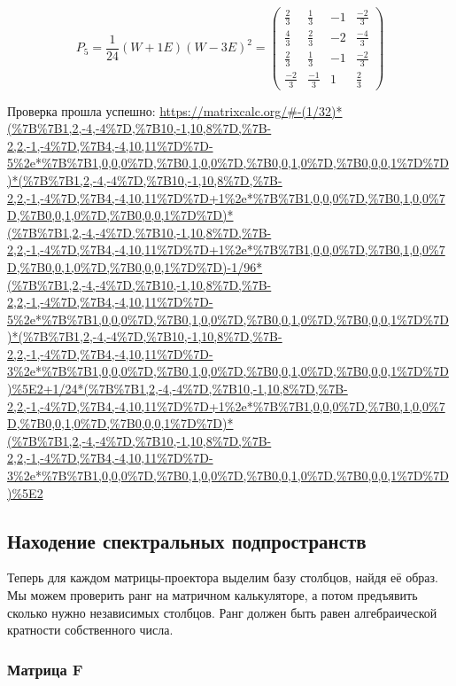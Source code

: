 \documentclass[12pt, a4paper]{article}
\begin{document}
    \begin{equation}
        P_{5} = \frac{1}{24} (W + 1E) (W - 3E)^2 = \left(\begin{matrix}
            \frac{2}{3} & \frac{1}{3} & -1 & \frac{-2}{3} \\
            \frac{4}{3} & \frac{2}{3} & -2 & \frac{-4}{3} \\
            \frac{2}{3} & \frac{1}{3} & -1 & \frac{-2}{3} \\
            \frac{-2}{3} & \frac{-1}{3} & 1 & \frac{2}{3}
        \end{matrix}\right)
    \end{equation}

    Проверка прошла успешно: \url{https://matrixcalc.org/#-(1/32)*(%7B%7B1,2,-4,-4%7D,%7B10,-1,10,8%7D,%7B-2,2,-1,-4%7D,%7B4,-4,10,11%7D%7D-5%2e*%7B%7B1,0,0,0%7D,%7B0,1,0,0%7D,%7B0,0,1,0%7D,%7B0,0,0,1%7D%7D)*(%7B%7B1,2,-4,-4%7D,%7B10,-1,10,8%7D,%7B-2,2,-1,-4%7D,%7B4,-4,10,11%7D%7D+1%2e*%7B%7B1,0,0,0%7D,%7B0,1,0,0%7D,%7B0,0,1,0%7D,%7B0,0,0,1%7D%7D)*(%7B%7B1,2,-4,-4%7D,%7B10,-1,10,8%7D,%7B-2,2,-1,-4%7D,%7B4,-4,10,11%7D%7D+1%2e*%7B%7B1,0,0,0%7D,%7B0,1,0,0%7D,%7B0,0,1,0%7D,%7B0,0,0,1%7D%7D)-1/96*(%7B%7B1,2,-4,-4%7D,%7B10,-1,10,8%7D,%7B-2,2,-1,-4%7D,%7B4,-4,10,11%7D%7D-5%2e*%7B%7B1,0,0,0%7D,%7B0,1,0,0%7D,%7B0,0,1,0%7D,%7B0,0,0,1%7D%7D)*(%7B%7B1,2,-4,-4%7D,%7B10,-1,10,8%7D,%7B-2,2,-1,-4%7D,%7B4,-4,10,11%7D%7D-3%2e*%7B%7B1,0,0,0%7D,%7B0,1,0,0%7D,%7B0,0,1,0%7D,%7B0,0,0,1%7D%7D)%5E2+1/24*(%7B%7B1,2,-4,-4%7D,%7B10,-1,10,8%7D,%7B-2,2,-1,-4%7D,%7B4,-4,10,11%7D%7D+1%2e*%7B%7B1,0,0,0%7D,%7B0,1,0,0%7D,%7B0,0,1,0%7D,%7B0,0,0,1%7D%7D)*(%7B%7B1,2,-4,-4%7D,%7B10,-1,10,8%7D,%7B-2,2,-1,-4%7D,%7B4,-4,10,11%7D%7D-3%2e*%7B%7B1,0,0,0%7D,%7B0,1,0,0%7D,%7B0,0,1,0%7D,%7B0,0,0,1%7D%7D)%5E2}


    \subsection{Находение спектральных подпространств}

    Теперь для каждом матрицы-проектора выделим базу столбцов, найдя её образ.
    Мы можем проверить ранг на матричном калькуляторе, а потом предъявить сколько нужно независимых столбцов. 
    Ранг должен быть равен алгебраической кратности собственного числа. 

    \subsubsection{Матрица F}
\end{document}
